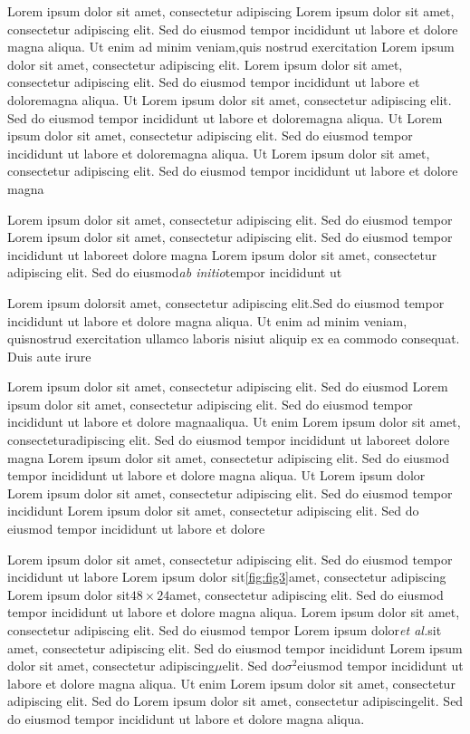 \documentclass{article}
\begin{document}
Lorem ipsum dolor sit amet, consectetur adipiscing
Lorem ipsum dolor sit amet, consectetur adipiscing elit. Sed do eiusmod tempor incididunt ut labore et dolore magna aliqua. Ut enim ad minim veniam,\cite{example2024}quis nostrud exercitation
Lorem ipsum dolor sit amet, consectetur adipiscing elit.
Lorem ipsum dolor sit amet, consectetur adipiscing elit. Sed do eiusmod tempor incididunt ut labore et dolore\cite{example2024}magna aliqua. Ut
Lorem ipsum dolor sit amet, consectetur adipiscing elit. Sed do eiusmod tempor incididunt ut labore et dolore\cite{example2024}magna aliqua. Ut
Lorem ipsum dolor sit amet, consectetur adipiscing elit. Sed do eiusmod tempor incididunt ut labore et dolore\cite{example2024}magna aliqua. Ut
Lorem ipsum dolor sit amet, consectetur adipiscing elit. Sed do eiusmod tempor incididunt ut labore et dolore magna

Lorem ipsum dolor sit amet, consectetur adipiscing elit. Sed do eiusmod tempor
Lorem ipsum dolor sit amet, consectetur adipiscing elit. Sed do eiusmod tempor incididunt ut labore\cite{example2024}et dolore magna
Lorem ipsum dolor sit amet, consectetur adipiscing elit. Sed do eiusmod\textit{ab initio}tempor incididunt ut

Lorem ipsum dolor\cite{example2024}sit amet, consectetur adipiscing elit.\cite{example2024}Sed do eiusmod tempor incididunt ut labore et dolore magna aliqua. Ut enim ad minim veniam, quis\cite{example2024}nostrud exercitation ullamco laboris nisi\cite{example2024}ut aliquip ex ea commodo consequat. Duis aute irure

Lorem ipsum dolor sit amet, consectetur adipiscing elit. Sed do eiusmod
Lorem ipsum dolor sit amet, consectetur adipiscing elit. Sed do eiusmod tempor incididunt ut labore et dolore magna\cite{example2024}aliqua. Ut enim
Lorem ipsum dolor sit amet, consectetur\cite{example2024}adipiscing elit. Sed do eiusmod tempor incididunt ut labore\cite{example2024}et dolore magna
Lorem ipsum dolor sit amet, consectetur adipiscing elit. Sed do eiusmod tempor incididunt ut labore et dolore magna aliqua. Ut
Lorem ipsum dolor
Lorem ipsum dolor sit amet, consectetur adipiscing elit. Sed do eiusmod tempor incididunt
Lorem ipsum dolor sit amet, consectetur adipiscing elit. Sed do eiusmod tempor incididunt ut labore et dolore

Lorem ipsum dolor sit amet, consectetur adipiscing elit. Sed do eiusmod tempor incididunt ut labore
Lorem ipsum dolor sit\ref{fig:fig3}amet, consectetur adipiscing
Lorem ipsum dolor sit$48 \times 24$amet, consectetur adipiscing elit. Sed do eiusmod tempor incididunt ut labore et dolore magna aliqua.
Lorem ipsum dolor sit amet, consectetur adipiscing elit. Sed do eiusmod tempor
Lorem ipsum dolor\textit{et al.}\cite{example2024}sit amet, consectetur adipiscing elit. Sed do eiusmod tempor incididunt
Lorem ipsum dolor sit amet, consectetur adipiscing$\mu$elit. Sed do$\sigma^2$eiusmod tempor incididunt ut labore et dolore magna aliqua. Ut enim
Lorem ipsum dolor sit amet, consectetur adipiscing elit. Sed do
Lorem ipsum dolor sit amet, consectetur adipiscing\cite{example2024}elit. Sed do eiusmod tempor incididunt ut labore et dolore magna aliqua.
\newpage
\end{document}
